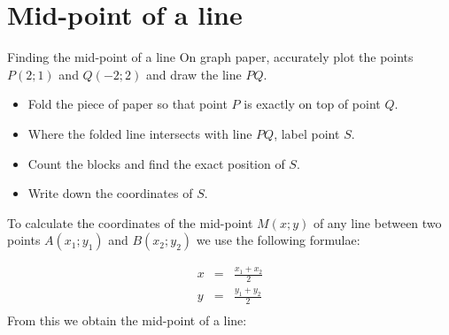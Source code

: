 \section{Mid-point of a line}

\begin{Investigation}{Finding the mid-point of a line}
On graph paper, accurately plot the points $P(2;1)$ and $Q(-2;2)$ and draw the line $PQ$.
\begin{itemize}
\item Fold the piece of paper so that point $P$ is exactly on top of point $Q$.
\item Where the folded line intersects with line $PQ$, label point $S$.
\item Count the blocks and find the exact position of $S$.
\item Write down the coordinates of $S$.
\end{itemize}
\end{Investigation}


To calculate the coordinates of the mid-point  $M(x;y)$ of any line between two points $A(x_1;y_1)$ and $B(x_2;y_2)$ we use the following formulae:

\setcounter{subfigure}{0}
\begin{figure}[H] %
\begin{center}
\end{center}
\end{figure}      

\begin{eqnarray*}
x & = & \frac{{x}_{1} + {x}_{2}}{2} \\ 
y & = & \frac{{y}_{1} + {y}_{2}}{2} \\  
\end{eqnarray*}
From this we obtain the mid-point of a line:

